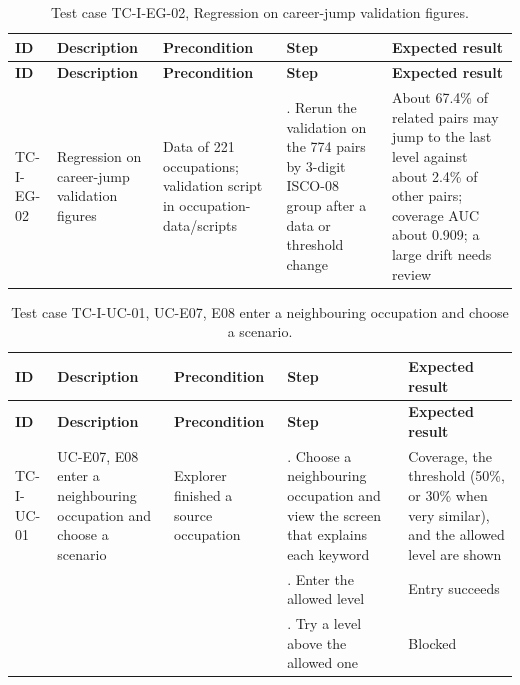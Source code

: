 {\small
\begin{longtable}{|>{\raggedright\arraybackslash}p{}|>{\raggedright\arraybackslash}p{}|>{\raggedright\arraybackslash}p{}|>{\raggedright\arraybackslash}p{}|>{\raggedright\arraybackslash}p{}|}
\caption{Test case TC-I-EG-02, Regression on career-jump validation figures.} \\
\hline
\textbf{ID} & \textbf{Description} & \textbf{Precondition} & \textbf{Step} & \textbf{Expected result} \\ \hline
\endfirsthead
\hline
\textbf{ID} & \textbf{Description} & \textbf{Precondition} & \textbf{Step} & \textbf{Expected result} \\ \hline
\endhead
TC-I-EG-02 & Regression on career-jump validation figures & Data of 221 occupations; validation script in occupation-data/scripts & 1. Rerun the validation on the 774 pairs by 3-digit ISCO-08 group after a data or threshold change & About 67.4\% of related pairs may jump to the last level against about 2.4\% of other pairs; coverage AUC about 0.909; a large drift needs review \\ \hline
\end{longtable}
}

{\small
\begin{longtable}{|>{\raggedright\arraybackslash}p{}|>{\raggedright\arraybackslash}p{}|>{\raggedright\arraybackslash}p{}|>{\raggedright\arraybackslash}p{}|>{\raggedright\arraybackslash}p{}|}
\caption{Test case TC-I-UC-01, UC-E07, E08 enter a neighbouring occupation and choose a scenario.} \\
\hline
\textbf{ID} & \textbf{Description} & \textbf{Precondition} & \textbf{Step} & \textbf{Expected result} \\ \hline
\endfirsthead
\hline
\textbf{ID} & \textbf{Description} & \textbf{Precondition} & \textbf{Step} & \textbf{Expected result} \\ \hline
\endhead
TC-I-UC-01 & UC-E07, E08 enter a neighbouring occupation and choose a scenario & Explorer finished a source occupation & 1. Choose a neighbouring occupation and view the screen that explains each keyword & Coverage, the threshold (50\%, or 30\% when very similar), and the allowed level are shown \\ \hline
 &  &  & 2. Enter the allowed level & Entry succeeds \\ \hline
 &  &  & 3. Try a level above the allowed one & Blocked \\ \hline
\end{longtable}
}

